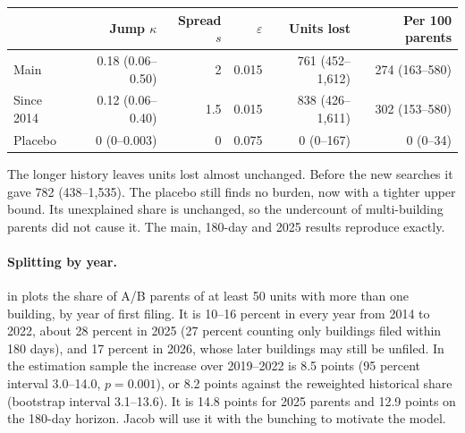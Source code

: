 \begin{center}
\small
\begin{tabular}{lrrrrr}
\hline
 & Jump $\kappa$ & Spread $s$ & $\varepsilon$ & Units lost & Per 100 parents \\
\hline
Main & 0.18 (0.06--0.50) & 2 & 0.015 & 761 (452--1,612) & 274 (163--580) \\
Since 2014 & 0.12 (0.06--0.40) & 1.5 & 0.015 & 838 (426--1,611) & 302 (153--580) \\
Placebo & 0 (0--0.003) & 0 & 0.075 & 0 (0--167) & 0 (0--34) \\
\hline
\end{tabular}
\end{center}

The longer history leaves units lost almost unchanged. Before the new searches
it gave 782 (438--1,535). The placebo still finds no burden, now with a tighter
upper bound. Its unexplained share is unchanged, so the undercount of
multi-building parents did not cause it. The main, 180-day and 2025 results
reproduce exactly.

\paragraph{Splitting by year.}  in
 plots the share of A/B parents of at least 50 units with
more than one building, by year of first filing. It is 10--16 percent in every
year from 2014 to 2022, about 28 percent in 2025 (27 percent counting only
buildings filed within 180 days), and 17 percent in 2026, whose later
buildings may still be unfiled. In the estimation sample the increase over
2019--2022 is 8.5 points (95 percent interval 3.0--14.0, $p = 0.001$), or 8.2
points against the reweighted historical share (bootstrap interval 3.1--13.6).
It is 14.8 points for 2025 parents and 12.9 points on the 180-day horizon.
Jacob will use it with the bunching to motivate the model.
